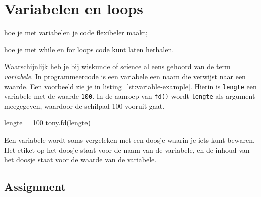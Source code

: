 \documentclass[../main]{subfiles}
\begin{document}
\graphicspath{{images/}}
\pagestyle{mypagestyle}

\chapter{Variabelen en loops}
\label{chap:variabelen-loops}

\begin{objectivesbox}
    \begin{objectiveslist}
        \item hoe je met variabelen je code flexibeler maakt;
        \item hoe je met while en for loops code kunt laten herhalen.
    \end{objectiveslist}
\end{objectivesbox}

\begin{figure}
\end{figure}
Waarschijnlijk heb je bij wiskunde of science al eens gehoord van de term \emph{variabele}. In programmeercode is een variabele een naam die verwijst naar een waarde. Een voorbeeld zie je in listing~\ref{lst:variable-example}. Hierin is \texttt{lengte} een variabele met de waarde \texttt{100}. In de aanroep van \texttt{fd()} wordt \texttt{lengte} als argument meegegeven, waardoor de schilpad 100 vooruit gaat.

\vspace{\baselineskip}

\begin{python}[style=mu, caption={De variabele \texttt{lengte}}, label={lst:variable-example}, numbers=none, aboveskip=0.5\baselineskip]
lengte = 100
tony.fd(lengte)
\end{python}

Een variabele wordt soms vergeleken met een doosje waarin je iets kunt bewaren. Het etiket op het doosje staat voor de naam van de variabele, en de inhoud van het doosje staat voor de waarde van de variabele.

\section{Assignment}
\label{sec:assignment}
\end{document}
